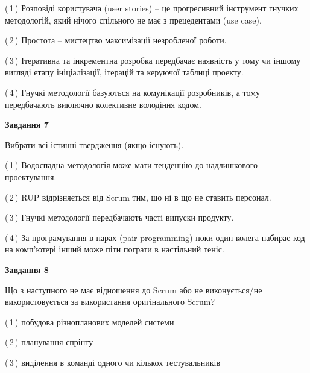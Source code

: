 \documentclass[10pt, ukrainian]{article}
\begin{document}
{\begin {large}
(\,1\,) Розповіді користувача (user stories) – це прогресивний інструмент гнучких методологій, який нічого спільного не має з прецедентами (use case). %



(\,2\,) Простота – мистецтво максимізації незробленої роботи. %



(\,3\,) Ітеративна та інкрементна розробка передбачає наявність у тому чи іншому вигляді етапу ініціалізації, ітерацій та керуючої таблиці проекту. %



(\,4\,) Гнучкі методології базуються на комунікації розробників, а тому передбачають виключно колективне володіння кодом. %


{\begin {center}\textbf{Завдання 7}\end {center}}\par
Вибрати всі істинні твердження (якщо існують).\par
\vspace{2mm}



(\,1\,) Водоспадна методологія може мати тенденцію до надлишкового проектування. %



(\,2\,) RUP відрізняється від Scrum тим, що ні в що не ставить персонал.%



(\,3\,) Гнучкі методології передбачають часті випуски продукту. %



(\,4\,) За програмування в парах (pair programming) поки один колега набирає код на комп'ютері інший може піти пограти в настільний теніс. %


{\begin {center}\textbf{Завдання 8}\end {center}}\par
Що з наступного не має відношення до Scrum або не виконується/не використовується за використання оригінального Scrum?\par
\vspace{2mm}



(\,1\,) побудова різнопланових моделей системи%



(\,2\,) планування спрінту%



(\,3\,) виділення в команді одного чи кількох тестувальників%




\end{large}}
\end{document}
